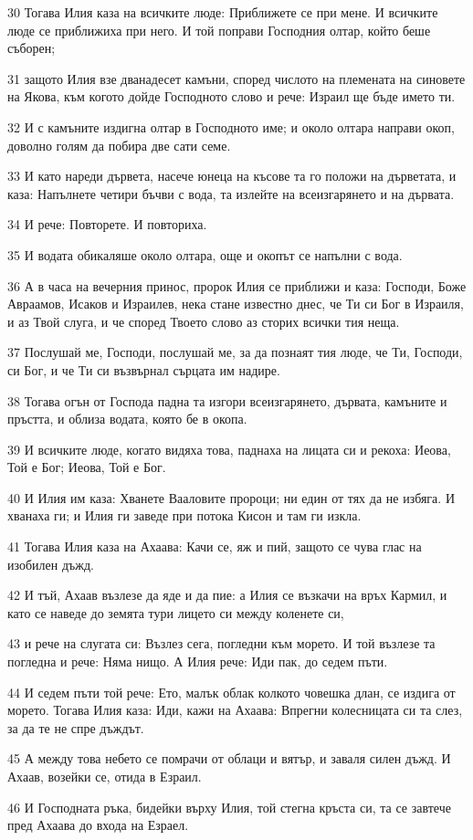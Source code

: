 \par 30 Тогава Илия каза на всичките люде: Приближете се при мене. И всичките люде се приближиха при него. И той поправи Господния олтар, който беше съборен;
\par 31 защото Илия взе дванадесет камъни, според числото на племената на синовете на Якова, към когото дойде Господното слово и рече: Израил ще бъде името ти.
\par 32 И с камъните издигна олтар в Господното име; и около олтара направи окоп, доволно голям да побира две сати семе.
\par 33 И като нареди дървета, насече юнеца на късове та го положи на дърветата, и каза: Напълнете четири бъчви с вода, та излейте на всеизгарянето и на дървата.
\par 34 И рече: Повторете. И повториха.
\par 35 И водата обикаляше около олтара, още и окопът се напълни с вода.
\par 36 А в часа на вечерния принос, пророк Илия се приближи и каза: Господи, Боже Авраамов, Исаков и Израилев, нека стане известно днес, че Ти си Бог в Израиля, и аз Твой слуга, и че според Твоето слово аз сторих всички тия неща.
\par 37 Послушай ме, Господи, послушай ме, за да познаят тия люде, че Ти, Господи, си Бог, и че Ти си възвърнал сърцата им надире.
\par 38 Тогава огън от Господа падна та изгори всеизгарянето, дървата, камъните и пръстта, и облиза водата, която бе в окопа.
\par 39 И всичките люде, когато видяха това, паднаха на лицата си и рекоха: Иеова, Той е Бог; Иеова, Той е Бог.
\par 40 И Илия им каза: Хванете Вааловите пророци; ни един от тях да не избяга. И хванаха ги; и Илия ги заведе при потока Кисон и там ги изкла.
\par 41 Тогава Илия каза на Ахаава: Качи се, яж и пий, защото се чува глас на изобилен дъжд.
\par 42 И тъй, Ахаав възлезе да яде и да пие: а Илия се възкачи на връх Кармил, и като се наведе до земята тури лицето си между коленете си,
\par 43 и рече на слугата си: Възлез сега, погледни към морето. И той възлезе та погледна и рече: Няма нищо. А Илия рече: Иди пак, до седем пъти.
\par 44 И седем пъти той рече: Ето, малък облак колкото човешка длан, се издига от морето. Тогава Илия каза: Иди, кажи на Ахаава: Впрегни колесницата си та слез, за да те не спре дъждът.
\par 45 А между това небето се помрачи от облаци и вятър, и заваля силен дъжд. И Ахаав, возейки се, отида в Езраил.
\par 46 И Господната ръка, бидейки върху Илия, той стегна кръста си, та се завтече пред Ахаава до входа на Езраел.

